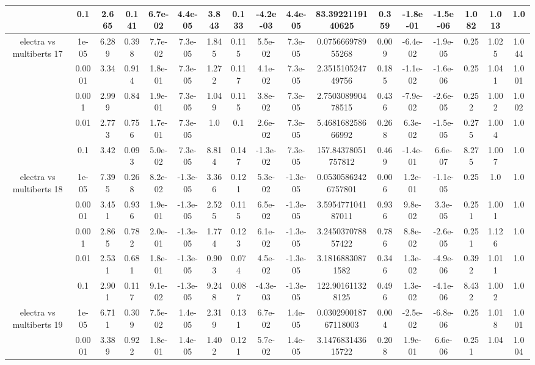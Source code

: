 \begin{tabular}{|c|c|c|c|c|c|c|c|c|c|c|c|c|c|c|c|c|}
 & 0.1 & 2.665 & 0.141 & 6.7e-02 & 4.4e-05 & 3.843 & 0.133 & -4.2e-03 & 4.4e-05 & 83.3922119140625 & 0.359 & -1.8e-01 & -1.5e-06 & 1.082 & 1.013 & 1.0 \\
\hline
\multirow{5}{*}{electra  vs multiberts 17} & 1e-05 & 6.289 & 0.398 & 7.7e-02 & 7.3e-05 & 1.845 & 0.115 & 5.5e-02 & 7.3e-05 & 0.075666978955268 & 0.009 & -6.4e-02 & -1.9e-05 & 0.25 & 1.025 & 1.044 \\
 & 0.0001 & 3.34 & 0.914 & 1.8e-01 & 7.3e-05 & 1.272 & 0.117 & 4.1e-02 & 7.3e-05 & 2.351510524749756 & 0.185 & -1.1e-02 & -1.6e-06 & 0.25 & 1.041 & 1.001 \\
 & 0.001 & 2.999 & 0.84 & 1.9e-01 & 7.3e-05 & 1.049 & 0.115 & 3.8e-02 & 7.3e-05 & 2.750308990478515 & 0.436 & -7.9e-02 & -2.6e-05 & 0.252 & 1.002 & 1.002 \\
 & 0.01 & 2.773 & 0.756 & 1.7e-01 & 7.3e-05 & 1.0 & 0.1 & 2.6e-02 & 7.3e-05 & 5.468168258666992 & 0.268 & 6.3e-02 & -1.5e-05 & 0.275 & 1.004 & 1.0 \\
 & 0.1 & 3.42 & 0.093 & 5.0e-02 & 7.3e-05 & 8.814 & 0.147 & -1.3e-02 & 7.3e-05 & 157.84378051757812 & 0.469 & -1.4e-01 & 6.6e-07 & 8.275 & 1.007 & 1.0 \\
\hline
\multirow{5}{*}{electra  vs multiberts 18} & 1e-05 & 7.395 & 0.268 & 8.2e-02 & -1.3e-05 & 3.366 & 0.121 & 5.3e-02 & -1.3e-05 & 0.05305862426757801 & 0.006 & 1.2e-01 & -1.1e-05 & 0.25 & 1.0 & 1.0 \\
 & 0.0001 & 3.451 & 0.936 & 1.9e-01 & -1.3e-05 & 2.525 & 0.115 & 6.5e-02 & -1.3e-05 & 3.595477104187011 & 0.936 & 9.8e-02 & 3.3e-05 & 0.251 & 1.001 & 1.0 \\
 & 0.001 & 2.865 & 0.782 & 2.0e-01 & -1.3e-05 & 1.774 & 0.123 & 6.1e-02 & -1.3e-05 & 3.245037078857422 & 0.786 & 8.8e-02 & -2.6e-05 & 0.251 & 1.126 & 1.0 \\
 & 0.01 & 2.531 & 0.681 & 1.8e-01 & -1.3e-05 & 0.903 & 0.074 & 4.5e-02 & -1.3e-05 & 3.18168830871582 & 0.346 & 1.3e-02 & -4.9e-06 & 0.392 & 1.011 & 1.0 \\
 & 0.1 & 2.901 & 0.117 & 9.1e-02 & -1.3e-05 & 9.248 & 0.087 & -4.3e-03 & -1.3e-05 & 122.901611328125 & 0.496 & 1.3e-02 & -4.1e-06 & 8.432 & 1.002 & 1.0 \\
\hline
\multirow{5}{*}{electra  vs multiberts 19} & 1e-05 & 6.711 & 0.309 & 7.5e-02 & 1.4e-05 & 2.319 & 0.131 & 6.7e-02 & 1.4e-05 & 0.030290018767118003 & 0.004 & -2.5e-02 & -6.8e-06 & 0.25 & 1.018 & 1.001 \\
 & 0.0001 & 3.389 & 0.922 & 1.8e-01 & 1.4e-05 & 1.402 & 0.121 & 5.7e-02 & 1.4e-05 & 3.147683143615722 & 0.208 & 1.9e-01 & 6.6e-06 & 0.251 & 1.04 & 1.004 \\

\end{tabular}
